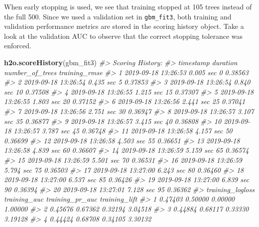 \documentclass[]{book}
\newenvironment{Shaded}{\begin{snugshade}}{\end{snugshade}}
\newcommand{\CommentTok}[1]{\textcolor[rgb]{0.56,0.35,0.01}{\textit{#1}}}
\newcommand{\KeywordTok}[1]{\textcolor[rgb]{0.13,0.29,0.53}{\textbf{#1}}}
\newcommand{\NormalTok}[1]{#1}
\begin{document}
When early stopping is used, we see that training stopped at 105 trees instead of the full 500. Since we used a validation set in \texttt{gbm\_fit3}, both training and validation performance metrics are stored in the scoring history object. Take a look at the validation AUC to observe that the correct stopping tolerance was enforced.

\begin{Shaded}
\begin{Highlighting}[]
\KeywordTok{h2o.scoreHistory}\NormalTok{(gbm_fit3)}
\CommentTok{#> Scoring History: }
\CommentTok{#>              timestamp   duration number_of_trees training_rmse}
\CommentTok{#> 1  2019-09-18 13:26:53  0.005 sec               0       0.38563}
\CommentTok{#> 2  2019-09-18 13:26:54  0.435 sec               5       0.37853}
\CommentTok{#> 3  2019-09-18 13:26:54  0.840 sec              10       0.37508}
\CommentTok{#> 4  2019-09-18 13:26:55  1.215 sec              15       0.37307}
\CommentTok{#> 5  2019-09-18 13:26:55  1.803 sec              20       0.37152}
\CommentTok{#> 6  2019-09-18 13:26:56  2.441 sec              25       0.37041}
\CommentTok{#> 7  2019-09-18 13:26:56  2.751 sec              30       0.36947}
\CommentTok{#> 8  2019-09-18 13:26:57  3.107 sec              35       0.36877}
\CommentTok{#> 9  2019-09-18 13:26:57  3.415 sec              40       0.36808}
\CommentTok{#> 10 2019-09-18 13:26:57  3.787 sec              45       0.36748}
\CommentTok{#> 11 2019-09-18 13:26:58  4.157 sec              50       0.36699}
\CommentTok{#> 12 2019-09-18 13:26:58  4.503 sec              55       0.36651}
\CommentTok{#> 13 2019-09-18 13:26:58  4.839 sec              60       0.36607}
\CommentTok{#> 14 2019-09-18 13:26:59  5.159 sec              65       0.36574}
\CommentTok{#> 15 2019-09-18 13:26:59  5.501 sec              70       0.36531}
\CommentTok{#> 16 2019-09-18 13:26:59  5.794 sec              75       0.36503}
\CommentTok{#> 17 2019-09-18 13:27:00  6.243 sec              80       0.36460}
\CommentTok{#> 18 2019-09-18 13:27:00  6.537 sec              85       0.36426}
\CommentTok{#> 19 2019-09-18 13:27:00  6.839 sec              90       0.36394}
\CommentTok{#> 20 2019-09-18 13:27:01  7.128 sec              95       0.36362}
\CommentTok{#>    training_logloss training_auc training_pr_auc training_lift}
\CommentTok{#> 1           0.47403      0.50000         0.00000       1.00000}
\CommentTok{#> 2           0.45676      0.67362         0.32194       3.04518}
\CommentTok{#> 3           0.44884      0.68117         0.33330       3.19128}
\CommentTok{#> 4           0.44424      0.68708         0.34105       3.30132}

\end{Highlighting}
\end{Shaded}
\end{document}
